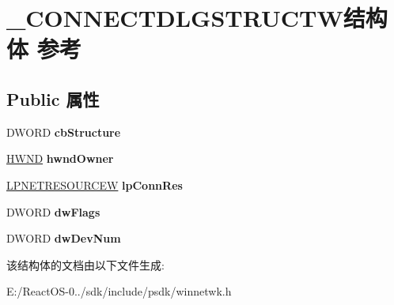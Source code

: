 \hypertarget{struct___c_o_n_n_e_c_t_d_l_g_s_t_r_u_c_t_w}{}\section{\+\_\+\+C\+O\+N\+N\+E\+C\+T\+D\+L\+G\+S\+T\+R\+U\+C\+T\+W结构体 参考}
\label{struct___c_o_n_n_e_c_t_d_l_g_s_t_r_u_c_t_w}
\subsection*{Public 属性}
\begin{DoxyCompactItemize}
\item 
\mbox{\label{struct___c_o_n_n_e_c_t_d_l_g_s_t_r_u_c_t_w_abf6477fd31ff66fbc3c0ec1514e3e535}} 
D\+W\+O\+RD {\bfseries cb\+Structure}
\item 
\mbox{\label{struct___c_o_n_n_e_c_t_d_l_g_s_t_r_u_c_t_w_a11387e58284e2e99dce7427ad8c32246}} 
\hyperlink{interfacevoid}{H\+W\+ND} {\bfseries hwnd\+Owner}
\item 
\mbox{\label{struct___c_o_n_n_e_c_t_d_l_g_s_t_r_u_c_t_w_ab2c5f42173e20cee3cb07cc5504cd4c1}} 
\hyperlink{struct___n_e_t_r_e_s_o_u_r_c_e_w}{L\+P\+N\+E\+T\+R\+E\+S\+O\+U\+R\+C\+EW} {\bfseries lp\+Conn\+Res}
\item 
\mbox{\label{struct___c_o_n_n_e_c_t_d_l_g_s_t_r_u_c_t_w_aff31383141c69ef214e0c6f745539a09}} 
D\+W\+O\+RD {\bfseries dw\+Flags}
\item 
\mbox{\label{struct___c_o_n_n_e_c_t_d_l_g_s_t_r_u_c_t_w_a04c5430da6403be6e62289992403a19f}} 
D\+W\+O\+RD {\bfseries dw\+Dev\+Num}
\end{DoxyCompactItemize}


该结构体的文档由以下文件生成\+:\begin{DoxyCompactItemize}
\item 
E\+:/\+React\+O\+S-\/0../sdk/include/psdk/winnetwk.\+h\end{DoxyCompactItemize}
